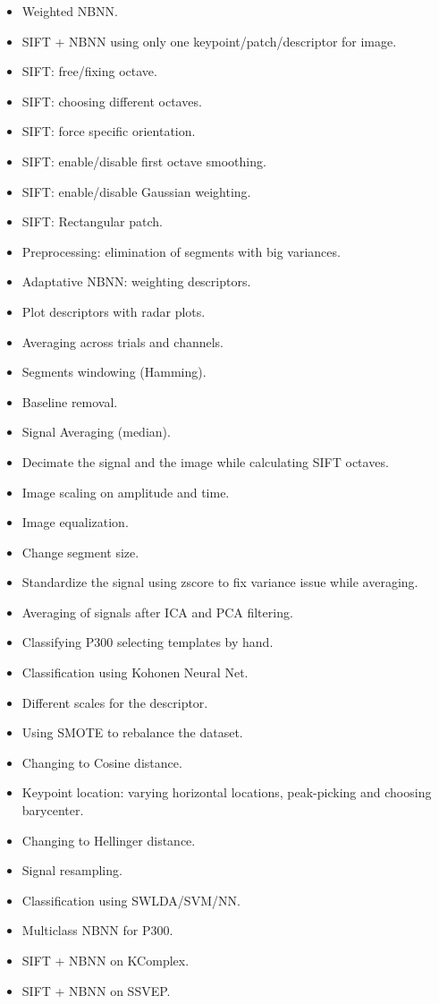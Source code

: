 \begin{itemize}
\item Weighted NBNN.
\item SIFT + NBNN using only one keypoint/patch/descriptor for image.
\item SIFT: free/fixing octave.
\item SIFT: choosing different octaves.
\item SIFT: force specific orientation.
\item SIFT: enable/disable first octave smoothing.
\item SIFT: enable/disable Gaussian weighting.
\item SIFT: Rectangular patch.
\item Preprocessing: elimination of segments with big variances.
\item Adaptative NBNN: weighting descriptors.
\item Plot descriptors with radar plots.
\item Averaging across trials and channels.
\item Segments windowing (Hamming).
\item Baseline removal.
\item Signal Averaging (median).
\item Decimate the signal and the image while calculating SIFT octaves.
\item Image scaling on amplitude and time.
\item Image equalization.
\item Change segment size.
\item Standardize the signal using zscore to fix variance issue while averaging.
\item Averaging of signals after ICA and PCA filtering.
\item Classifying P300 selecting templates by hand.
\item Classification using Kohonen Neural Net.
\item Different scales for the descriptor.
\item Using SMOTE to rebalance the dataset.
\item Changing to Cosine distance.
\item Keypoint location: varying horizontal locations, peak-picking and choosing barycenter.
\item Changing to Hellinger distance.
\item Signal resampling.
\item Classification using SWLDA/SVM/NN.
\item Multiclass NBNN for P300.
\item SIFT + NBNN on KComplex.
\item SIFT + NBNN on SSVEP.
\end{itemize}


